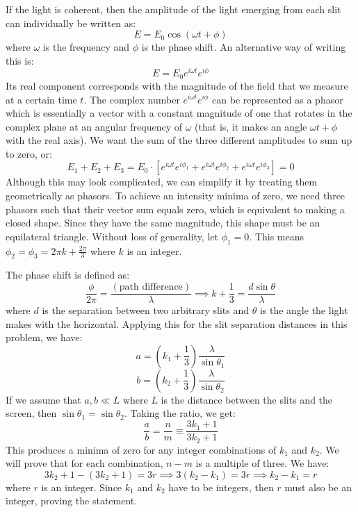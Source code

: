 \begin{custom-simple}[Problem 3]
If the light is coherent, then the amplitude of the light emerging from each slit can individually be written as:
$$E=E_0\cos(\omega t + \phi)$$
where $\omega$ is the frequency and $\phi$ is the phase shift. An alternative way of writing this is:
$$E=E_0e^{i\omega t}e^{i\phi}$$
Its real component corresponds with the magnitude of the field that we measure at a certain time $t$. The complex number $e^{i\omega t}e^{i\phi}$ can be represented as a phasor which is essentially a vector with a constant magnitude of one that rotates in the complex plane at an angular frequency of $\omega$ (that is, it makes an angle $\omega t+\phi$ with the real axis). We want the sum of the three different amplitudes to sum up to zero, or:
$$E_1+E_2+E_3=E_0\cdot \left[e^{i\omega t}e^{i\phi_1}+e^{i\omega t}e^{i\phi_2}+e^{i\omega t}e^{i\phi_3}\right] = 0$$
Although this may look complicated, we can simplify it by treating them geometrically as phasors. To achieve an intensity minima of zero, we need three phasors such that their vector sum equals zero, which is equivalent to making a closed shape. Since they have the same magnitude, this shape must be an equilateral triangle. Without loss of generality, let $\phi_1=0$. This means $\phi_2=\phi_3=2\pi k + \frac{2\pi}{3}$ where $k$ is an integer.

The phase shift is defined as:
$$\frac{\phi}{2\pi} = \frac{(\text{path difference})}{\lambda} \implies k+ \frac{1}{3} = \frac{d\sin\theta}{\lambda}$$
where $d$ is the separation between two arbitrary slits and $\theta$ is the angle the light makes with the horizontal. Applying this for the slit separation distances in this problem, we have:
$$a = \left(k_1+\frac{1}{3}\right)\frac{\lambda}{\sin\theta_1}$$
$$b = \left(k_2+\frac{1}{3}\right)\frac{\lambda}{\sin\theta_2}$$
If we assume that $a,b \ll L$ where $L$ is the distance between the slits and the screen, then $\sin\theta_1=\sin\theta_2$. Taking the ratio, we get:
$$\frac{a}{b} = \frac{n}{m} \equiv \frac{3k_1+1}{3k_2+1}$$
This produces a minima of zero for any integer combinations of $k_1$ and $k_2$. We will prove that for each combination, $n-m$ is a multiple of three. We have:
$$3k_2+1 - (3k_2+1) = 3r \implies 3(k_2-k_1)=3r \implies k_2-k_1=r$$
where $r$ is an integer. Since $k_1$ and $k_2$ have to be integers, then $r$ must also be an integer, proving the statement.
\end{custom-simple}